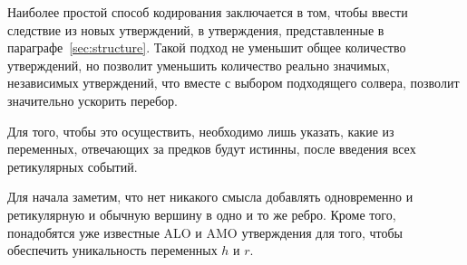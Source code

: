 Наиболее простой способ кодирования заключается в том, чтобы ввести следствие из новых утверждений, в утверждения, представленные в параграфе~\ref{sec:structure}.
Такой подход не уменьшит общее количество утверждений, но позволит уменьшить количество реально значимых, независимых утверждений, что вместе с выбором подходящего солвера, позволит значительно ускорить перебор.

Для того, чтобы это осуществить, необходимо лишь указать, какие из переменных, отвечающих за предков будут истинны, после введения всех ретикулярных событий.

Для начала заметим, что нет никакого смысла добавлять одновременно и ретикулярную и обычную вершину в одно и то же ребро.
Кроме того, понадобятся уже известные ALO и AMO утверждения для того, чтобы обеспечить уникальность переменных $h$ и $r$.




